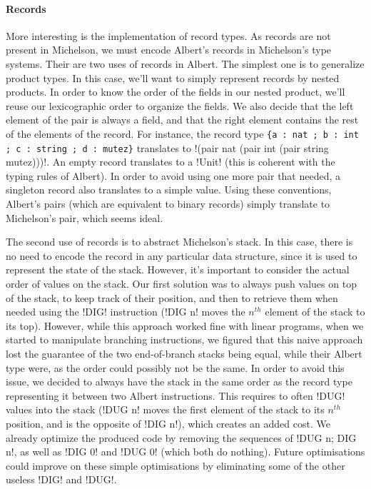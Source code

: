 \documentclass{report}
\begin{document}
\paragraph{Records}
More interesting is the implementation of record types. As records are not present in Michelson, we must encode Albert's records in Michelson's type systems. Their are two uses of records in Albert. The simplest one is to generalize product types. In this case, we'll want to simply represent records by nested products. In order to know the order of the fields in our nested product, we'll reuse our lexicographic order to organize the fields. We also decide that the left element of the pair is always a field, and that the right element contains the rest of the elements of the record. For instance, the record type \lstinline|{a : nat ; b : int ; c : string ; d : mutez}| translates to !(pair nat (pair int (pair string mutez)))!. An empty record translates to a !Unit! (this is coherent with the typing rules of Albert). In order to avoid using one more pair that needed, a singleton record also translates to a simple value. Using these conventions, Albert's pairs (which are equivalent to binary records) simply translate to Michelson's pair, which seems ideal.

The second use of records is to abstract Michelson's stack. In this case, there is no need to encode the record in any particular data structure, since it is used to represent the state of the stack. However, it's important to consider the actual order of values on the stack. Our first solution was to always push values on top of the stack, to keep track of their position, and then to retrieve them when needed using the !DIG! instruction (!DIG n! moves the $n^{th}$ element of the stack to its top). However, while this approach worked fine with linear programs, when we started to manipulate branching instructions, we figured that this naive approach lost the guarantee of the two end-of-branch stacks being equal, while their Albert type were, as the order could possibly not be the same. In order to avoid this issue, we decided to always have the stack in the same order as the record type representing it between two Albert instructions. This requires to often !DUG! values into the stack (!DUG n! moves the first element of the stack to its $n^{th}$ position, and is the opposite of !DIG n!), which creates an added cost. We already optimize the produced code by removing the sequences of !DUG n; DIG n!, as well as !DIG 0! and !DUG 0! (which both do nothing). Future optimisations could improve on these simple optimisations by eliminating some of the other useless !DIG! and !DUG!.
\end{document}
